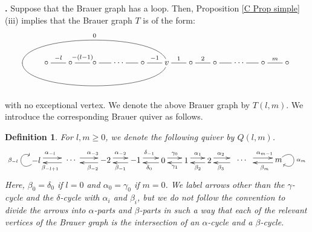 \documentclass[12pt]{amsart}
\newtheorem{definition}[thm]{Definition}
\def \para{\refstepcounter{thm} \par\medskip\noindent
                \textbf{\thethm .} }
\numberwithin{equation}{thm}
\newcounter{ni}
\begin{document}
\para
Suppose that the Brauer graph has a loop. Then, Proposition \ref{C Prop simple}(iii) implies that
the Brauer graph $T$ is of the form:
\begin{equation}
\label{D I-2 Brauer graph}
\begin{xy}
(0,0)*[o]+{\circ}="0",(10,0)*[o]+{\circ}="1",(20,0)*[o]+{\circ}="2", (30,0)*[o]+{\cdots}="d1",(40,0)*[o]+{\circ}="3",
(50,0)*[o]+{v}="v",(60,0)*[o]+{\circ}="4",(70,0)*[o]+{\circ}="5", (80,0)*[o]+{\cdots}="d3",(90,0)*[o]+{\circ}="6",
(-10,0)*{}="dammy",(100,0)*[o]+{\circ}="7"
\ar @{-}"0";"1"^{-l}
\ar @{-}"1";"2"^{-(l-1)}
\ar @{-}"2";"d1"
\ar @{-}"d1";"3"
\ar @{-}"3";"v"^{-1}
\ar @{-}"v";"4"^{1}
\ar @{-}"4";"5"^{2}
\ar @{-}"5";"d3"
\ar @{-}"d3";"6"
\ar @{-}"6";"7"^{m}
\ar @{-} @(u,u)"v";"dammy"_{0}
\ar @{-} @(d,d)"dammy";"v"
\end{xy}
\end{equation}
with no exceptional vertex.
We denote the above Brauer graph by $T(l,m)$. We introduce the corresponding Brauer quiver as follows.

\begin{definition}
For $l,m\geq 0$, we denote the following quiver by $Q(l,m)$.
\[
\begin{xy}
(-55,0)*[o]+{-l}="-l",(-43,0)*[o]+{}="-l+1", (-40,0)*{\cdots}="d1",(-36,0)*{}="-3",(-25,0)*[o]+{-2}="-2",(-12,0)*[o]+{-1}="-1",
(0,0)*[o]+{0}="0",(10,0)*[o]+{1}="1",(20,0)*[o]+{2}="2", (30,0)*[o]+{}="3",(34,0)*{\cdots}="d1",(38,0)*[o]+{}="m-1",
(50,0)*[o]+{m}="m"
\ar @<1mm> "-l";"-l+1"^{\alpha_{-l}}
\ar @<1mm> "-l+1";"-l"^{\beta_{-l+1}}
\ar @<1mm> "-3";"-2"^{\alpha_{-3}}
\ar @<1mm> "-2";"-3"^{\beta_{-2}}
\ar @<1mm> "-2";"-1"^{\alpha_{-2}}
\ar @<1mm> "-1";"-2"^{\beta_{-1}}
\ar @<1mm> "-1";"0"^{\delta_{-1}}
\ar @<1mm> "0";"-1"^{\delta_{0}}
\ar @<1mm> "0";"1"^{\gamma_{0}}
\ar @<1mm> "1";"0"^{\gamma_{1}}
\ar @<1mm> "1";"2"^{\alpha_{1}}
\ar @<1mm> "2";"1"^{\beta_{2}}
\ar @<1mm> "2";"3"^{\alpha_{2}}
\ar @<1mm> "3";"2"^{\beta_{3}}
\ar @<1mm> "m-1";"m"^{\alpha_{m-1}}
\ar @<1mm> "m";"m-1"^{\beta_{m}}
\SelectTips{eu}{}
\ar @(dl,ul)"-l";"-l"^{\beta_{-l}}
\ar @(ur,dr)"m";"m"^{\alpha_m}
\end{xy}
\]
Here, $\beta_{0}=\delta_{0}$ if $l=0$ and $\alpha_0=\gamma_0$ if $m=0$. 
We label arrows other than the $\gamma$-cycle and the $\delta$-cycle with $\alpha_i$ and $\beta_i$, but 
we do not follow the convention to divide the arrows into $\alpha$-parts and $\beta$-parts in such a way that 
each of the relevant vertices of the Brauer graph is the intersection of an $\alpha$-cycle and a $\beta$-cycle.
\end{definition}
\end{document}
